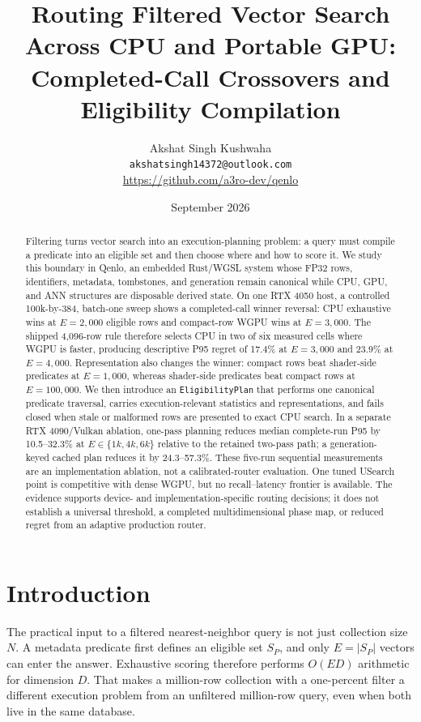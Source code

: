 \documentclass[10pt]{article}
\title{Routing Filtered Vector Search Across CPU and Portable GPU:\\Completed-Call Crossovers and Eligibility Compilation}
\author{Akshat Singh Kushwaha\\
\texttt{akshatsingh14372@outlook.com}\\
\url{https://github.com/a3ro-dev/qenlo}}
\date{September 2026}
\newcommand{\qenlo}{Qenlo}
\newcommand{\E}{E}
\newcommand{\D}{D}
\begin{document}
\maketitle

\begin{abstract}
Filtering turns vector search into an execution-planning problem: a query must compile a predicate into an eligible set and then choose where and how to score it. We study this boundary in \qenlo{}, an embedded Rust/WGSL system whose FP32 rows, identifiers, metadata, tombstones, and generation remain canonical while CPU, GPU, and ANN structures are disposable derived state. On one RTX 4050 host, a controlled 100k-by-384, batch-one sweep shows a completed-call winner reversal: CPU exhaustive wins at \(\E=2{,}000\) eligible rows and compact-row WGPU wins at \(\E=3{,}000\). The shipped 4,096-row rule therefore selects CPU in two of six measured cells where WGPU is faster, producing descriptive P95 regret of 17.4\% at \(\E=3{,}000\) and 23.9\% at \(\E=4{,}000\). Representation also changes the winner: compact rows beat shader-side predicates at \(\E=1{,}000\), whereas shader-side predicates beat compact rows at \(\E=100{,}000\). We then introduce an \texttt{EligibilityPlan} that performs one canonical predicate traversal, carries execution-relevant statistics and representations, and fails closed when stale or malformed rows are presented to exact CPU search. In a separate RTX 4090/Vulkan ablation, one-pass planning reduces median complete-run P95 by 10.5--32.3\% at \(\E\in\{1k,4k,6k\}\) relative to the retained two-pass path; a generation-keyed cached plan reduces it by 24.3--57.3\%. These five-run sequential measurements are an implementation ablation, not a calibrated-router evaluation. One tuned USearch point is competitive with dense WGPU, but no recall--latency frontier is available. The evidence supports device- and implementation-specific routing decisions; it does not establish a universal threshold, a completed multidimensional phase map, or reduced regret from an adaptive production router.
\end{abstract}

\section{Introduction}
The practical input to a filtered nearest-neighbor query is not just collection size \(N\). A metadata predicate first defines an eligible set \(S_P\), and only \(\E=|S_P|\) vectors can enter the answer. Exhaustive scoring therefore performs \(O(\E\D)\) arithmetic for dimension \(\D\). That makes a million-row collection with a one-percent filter a different execution problem from an unfiltered million-row query, even when both live in the same database.
\end{document}
